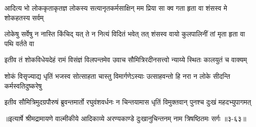 \twolineshloka
{आदित्य भो लोककृताकृतज्ञ लोकस्य सत्यानृतकर्मसाक्षिन्}
{मम प्रिया सा क्व गता हृता वा शंसस्व मे शोकहतस्य सर्वम्} %

\twolineshloka
{लोकेषु सर्वेषु न नास्ति किंचिद् यत् ते न नित्यं विदितं भवेत् तत्}
{शंसस्व वायो कुलपालिनीं तां मृता हृता वा पथि वर्तते वा} %

\twolineshloka
{इतीव तं शोकविधेयदेहं रामं विसंज्ञं विलपन्तमेव}
{उवाच सौमित्रिरदीनसत्त्वो न्याय्ये स्थितः कालयुतं च वाक्यम्} %

\twolineshloka
{शोकं विसृज्याद्य धृतिं भजस्व सोत्साहता चास्तु विमार्गणेऽस्याः}
{उत्साहवन्तो हि नरा न लोके सीदन्ति कर्मस्वतिदुष्करेषु} %

\twolineshloka
{इतीव सौमित्रिमुदग्रपौरुषं ब्रुवन्तमार्तो रघुवंशवर्धनः}
{न चिन्तयामास धृतिं विमुक्तवान् पुनश्च दुःखं महदभ्युपागमत्} %


॥इत्यार्षे श्रीमद्रामायणे वाल्मीकीये आदिकाव्ये अरण्यकाण्डे दुःखानुचिन्तनम् नाम त्रिषष्ठितमः सर्गः ॥३-६३॥
